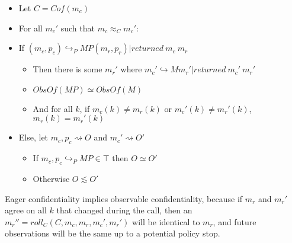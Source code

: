 \documentclass{article}
\begin{document}
      \begin{itemize}
        \item Let \(C = \mathit{Cof}(m_c)\)
        \item For all \(m_c'\) such that \(m_c \approx_C m_c'\):
        \item If \((m_c,p_c) \hookrightarrow_P MP (m_r,p_r) | \mathit{returned}\ m_c\ m_r\)
          \begin{itemize}
            \item Then there is some \(m_r'\) where
              \(m_c' \hookrightarrow M m_r' | \mathit{returned}\ m_c'\ m_r'\)
            \item \(\mathit{ObsOf}(MP) \simeq \mathit{ObsOf}(M)\)
            \item And for all \(k\), if \(m_c(k) \not = m_r(k)\) or \(m_c'(k) \not = m_r'(k)\),
              \(m_r(k) = m_r'(k)\)
          \end{itemize}
        \item Else, let \(m_c,p_c \rightsquigarrow O\) and \(m_c' \rightsquigarrow O'\)
          \begin{itemize}
            \item If \(m_c,p_c \hookrightarrow_P MP \in \top\) then \(O \simeq O'\)
            \item Otherwise \(O \lesssim O'\)
          \end{itemize}
      \end{itemize}

      Eager confidentiality implies observable confidentiality, because if \(m_r\) and \(m_r'\) agree
      on all \(k\) that changed during the call, then an \(m_r'' = \mathit{roll}_C(C,m_c,m_r,m_c',m_r')\)
      will be identical to \(m_r\), and future observations will be the same up to a potential policy
      stop.
 
\end{document}
